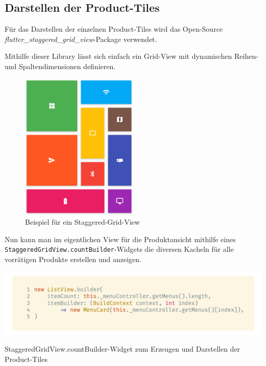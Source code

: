 \subsection{Darstellen der Product-Tiles}

Für das Darstellen der einzelnen Product-Tiles wird das Open-Source \textit{flutter\_staggered\_grid\_view}-Package
verwendet. \cite{flutterStaggeredGridView}

Mithilfe dieser Library lässt sich einfach ein Grid-View mit dynamischen Reihen- und 
Spaltendimensionen definieren.

\begin{figure}[H]
    \centering
    \includegraphics[width=0.5\textwidth]{images/Client/views/productview/staggeredGrid.png}
    \caption{Beispiel für ein Staggered-Grid-View \cite{flutterStaggeredGridViewImage}}
\end{figure}

Nun kann man im eigentlichen View für die Produktansicht mithilfe eines
\lstinline{StaggeredGridView.countBuilder}-Widgets die diversen Kacheln für alle vorrätigen Produkte
erstellen und anzeigen.

\begin{code}[H]
    \centering
    \includegraphics[width=1\textwidth]{images/Client/views/menuview/menuListViewBuilder.png}
    \vspace{-20pt}
    \caption{StaggeredGridView.countBuilder-Widget zum Erzeugen und Darstellen der Product-Tiles}
\end{code}

\newpage